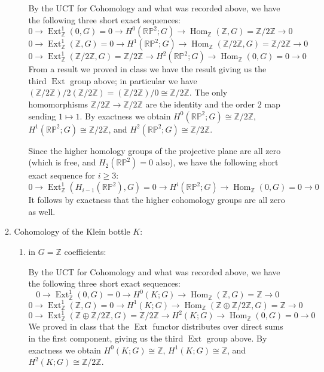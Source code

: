 \documentclass[11pt]{article}
\DeclareMathOperator{\Hom}{Hom}
\DeclareMathOperator{\Ext}{Ext}
\begin{document}
\begin{enumerate}
\begin{enumerate}
\begin{enumerate}
        By the UCT for Cohomology and what was recorded above, we have the following three short exact sequences:
        \[0\to \Ext_\mathbb{Z}^1(0, G)=0\to H^0(\mathbb{RP}^2;G)\to \Hom_\mathbb{Z}(\mathbb{Z},G)=\mathbb{Z}/2\mathbb{Z}\to 0\]
        \[0\to \Ext_\mathbb{Z}^1(\mathbb{Z}, G)=0\to H^1(\mathbb{RP}^2;G)\to \Hom_\mathbb{Z}(\mathbb{Z}/2\mathbb{Z},G)=\mathbb{Z}/2\mathbb{Z}\to 0\]
        \[0\to \Ext_\mathbb{Z}^1(\mathbb{Z}/2\mathbb{Z}, G)=\mathbb{Z}/2\mathbb{Z}\to H^2(\mathbb{RP}^2;G)\to \Hom_\mathbb{Z}(0,G)=0\to 0\] 
        From a result we proved in class we have the result giving us the third $\Ext$ group above; in particular we have $(\mathbb{Z}/2\mathbb{Z})/2(\mathbb{Z}/2\mathbb{Z})= (\mathbb{Z}/2\mathbb{Z})/0 \cong \mathbb{Z}/2\mathbb{Z}$. The only homomorphisms $\mathbb{Z}/2\mathbb{Z}\to \mathbb{Z}/2\mathbb{Z}$ are the identity and the order $2$ map sending $1\mapsto 1$. By exactness we obtain $H^0(\mathbb{RP}^2;G)\cong\mathbb{Z}/2\mathbb{Z}$, $H^1(\mathbb{RP}^2;G)\cong \mathbb{Z}/2\mathbb{Z}$, and $H^2(\mathbb{RP}^2;G)\cong\mathbb{Z}/2\mathbb{Z}$.

        Since the higher homology groups of the projective plane are all zero (which is free, and $H_2(\mathbb{RP}^2)=0$ also), we have the following short exact sequence for $i\geq 3$: \[0\to \Ext_\mathbb{Z}^1(H_{i-1}(\mathbb{RP}^2), G)=0\to H^i(\mathbb{RP}^2;G)\to \Hom_\mathbb{Z}(0,G)=0\to 0\] It follows by exactness that the higher cohomology groups are all zero as well.
      \end{enumerate}
      \item Cohomology of the Klein bottle $K$:\begin{enumerate}
        \item in $G=\mathbb{Z}$ coefficients:
        
        By the UCT for Cohomology and what was recorded above, we have the following three short exact sequences:
        \[0\to \Ext_\mathbb{Z}^1(0, G)=0\to H^0(K;G)\to \Hom_\mathbb{Z}(\mathbb{Z},G)=\mathbb{Z}\to 0\]
        \[0\to \Ext_\mathbb{Z}^1(\mathbb{Z}, G)=0\to H^1(K;G)\to \Hom_\mathbb{Z}(\mathbb{Z}\oplus \mathbb{Z}/2\mathbb{Z},G)=\mathbb{Z}\to 0\]
        \[0\to \Ext_\mathbb{Z}^1(\mathbb{Z}\oplus \mathbb{Z}/2\mathbb{Z}, G)= \mathbb{Z}/2\mathbb{Z}\to H^2(K;G)\to \Hom_\mathbb{Z}(0,G)=0\to 0\] 
        We proved in class that the $\Ext$ functor distributes over direct sums in the first component, giving us the third $\Ext$ group above. By exactness we obtain $H^0(K;G)\cong\mathbb{Z}$, $H^1(K;G)\cong \mathbb{Z}$, and $H^2(K;G)\cong\mathbb{Z}/2\mathbb{Z}$.


\end{enumerate}
\end{enumerate}
\end{enumerate}
\end{document}
